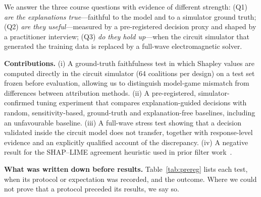 \documentclass[conference,10pt]{IEEEtran}
\begin{document}
We answer the three course questions with evidence of different strength:
(Q1) \emph{are the explanations true}---faithful to the model and to a simulator ground truth;
(Q2) \emph{are they useful}---measured by a pre-registered decision proxy and shaped by a practitioner interview;
(Q3) \emph{do they hold up}---when the circuit simulator that generated the training data is replaced by a full-wave electromagnetic solver.

\textbf{Contributions.}
(i) A ground-truth faithfulness test in which Shapley values are computed directly in the circuit simulator (64 coalitions per design) on a test set frozen before evaluation, allowing us to distinguish model-game mismatch from differences between attribution methods.
(ii) A pre-registered, simulator-confirmed tuning experiment that compares explanation-guided decisions with random, sensitivity-based, ground-truth and explanation-free baselines, including an unfavourable baseline.
(iii) A full-wave stress test showing that a decision validated inside the circuit model does not transfer, together with response-level evidence and an explicitly qualified account of the discrepancy.
(iv) A negative result for the SHAP--LIME agreement heuristic used in prior filter work~\cite{suslova2026}.

\textbf{What was written down before results.} Table~\ref{tab:prereg} lists each test, when its protocol or expectation was recorded, and the outcome. Where we could not prove that a protocol preceded its results, we say so.
\end{document}
